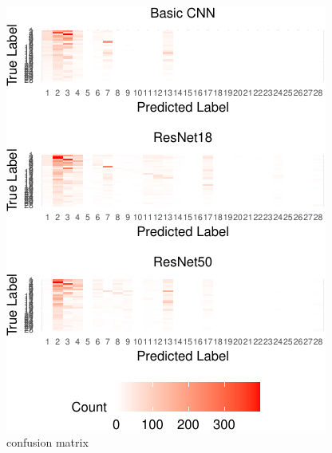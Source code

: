 \documentclass[letterpaper,9pt,twocolumn,twoside,]{pinp}
\begin{document}
\begin{figure}[h]

{\centering \includegraphics{Image02_final_report_files/figure-latex/unnamed-chunk-10-1} 

}

\caption{confusion matrix}\label{fig:unnamed-chunk-10}
\end{figure}

\newpage





\end{document}
